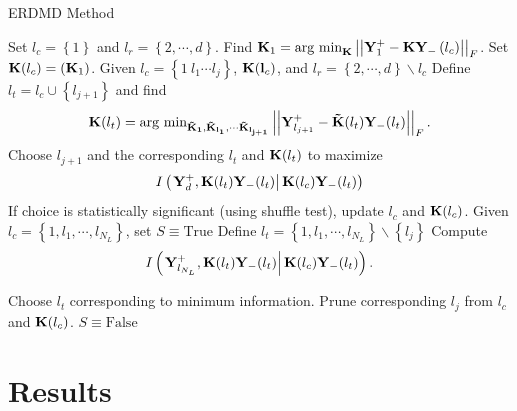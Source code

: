 \documentclass[a4paper,11pt]{article}
\newcommand{\gnorm}[1]{\left|\left|#1\right|\right|}
\begin{document}
\begin{algorithm}
\caption{ERDMD Method}
\begin{algorithmic}[1]
        \State Set $l_{c}=\left\{1\right\}$ and $l_{r}=\left\{2, \cdots, d\right\}$.
        \State Find ${\bf K}_{1} =  \text{arg min}_{\bf K}\gnorm{{\bf Y}^{+}_{1}-{\bf K}{\bf Y}_{-}\left(l_{c}\right)}_{F}$.  Set ${\bf K}(l_{c})=({\bf K}_{1})$.
    \EndProcedure
{}
        \State Given $l_{c}=\left\{1~l_{1} \cdots l_{j}\right\}$, ${\bf K}({\bf l}_{c})$, and $l_{r}=\left\{2,\cdots,d\right\}\backslash l_{c}$        
        \State Define $l_{t}=l_{c}\cup \left\{l_{j+1}\right\}$ and find
        \[
        {\bf K}(l_{t}) = \text{arg min}_{\bf \tilde{K}_{1}, {\bf \tilde{K}}_{l_{1}}, \cdots {\bf \tilde{K}}_{l_{j+1}}}\gnorm{{\bf Y}^{+}_{l_{j+1}}-{\bf \tilde{K}}(l_{t}){\bf Y}_{-}(l_{t}) }_{F}.
        \]          
    \EndFor
    \State Choose $l_{j+1}$ and the corresponding $l_{t}$ and ${\bf K}(l_{t})$ to maximize
        \[
        I\left(\left. {\bf Y}^{+}_{d}, {\bf K}(l_{t}){\bf Y}_{-}(l_{t})\right|{\bf K}(l_{c}){\bf Y}_{-}(l_{t})\right)
        \]
        \State If choice is statistically significant (using shuffle test), update $l_{c}$ and ${\bf K}(l_{c})$.
    \EndWhile
    \EndProcedure
        \State Given $l_{c}=\left\{1,l_{1}, \cdots, l_{N_{L}}\right\}$, set $S \equiv \text{True}$
        	\State Define $l_{t}=\left\{1,l_{1}, \cdots, l_{N_{L}}\right\}\backslash \left\{l_{j}\right\}$
            \State Compute
            \[
            I\left(\left. {\bf Y}^{+}_{l_{N_{L}}}, {\bf K}(l_{t}){\bf Y}_{-}(l_{t})\right|{\bf K}(l_{c}){\bf Y}_{-}(l_{t})\right).
            \]
            
        \EndFor
        \State Choose $l_{t}$ corresponding to minimum information.  
        \State Prune corresponding $l_{j}$ from $l_{c}$ and ${\bf K}(l_{c})$.
        \Else
        \State $S\equiv \text{False}$
        \EndIf
        \EndWhile
    \EndProcedure
\end{algorithmic}
\label{erdmd}
\end{algorithm}

\section{Results}
\end{document}
